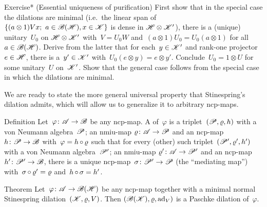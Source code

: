 \documentclass[b]{subfiles}
\begin{document}
\begin{parsec}
\begin{point}{Exercise* (Essential uniqueness of purification)}
    First show that in the special case the dilations are minimal
    (i.e.~the linear span of~$\{(a \otimes 1) V x;\  a \in \mathscr{B}(\mathscr{H}), x \in \mathscr{K}\}$ is dense
            in $\mathscr{H} \otimes \mathscr{K}'$),
        there is a (unique) unitary~$U_0$ on $\mathscr{H} \otimes \mathscr{K}'$
        with~$V = U_0 W$ and~$(a \otimes 1) U_0 = U_0 (a \otimes 1)$
            for all~$a \in \mathscr{B}(\mathscr{H})$.
    Derive from the latter
    that for each~$y \in \mathscr{K}'$ and rank-one projector~$e \in \mathscr{H}$,
        there is a~$y' \in \mathscr{K}'$
        with~$U_0 (e \otimes y) = e \otimes y'$.
    Conclude~$U_0 = 1 \otimes U$ for some unitary~$U$ on~$\mathscr{K}'$.
    Show  that the general case follows from the special case
        in which the dilations are minimal.
\end{point}
\end{parsec}
\begin{parsec}%
\begin{point}%
    We are ready to state the more general universal property
        that Stinespring's dilation admits,
        which will allow us to generalize it to arbitrary ncp-maps.
\end{point}
\begin{point}{Definition}%
    Let~$\varphi\colon \mathscr{A} \to \mathscr{B}$
        be any ncp-map.
    A  of~$\varphi$
    is a triplet~$(\mathscr{P}, \varrho, h)$
    with a von Neumann algebra~$\mathscr{P}$;
    an nmiu-map $\varrho \colon \mathscr{A} \to \mathscr{P}$
    and an ncp-map~$h \colon \mathscr{P} \to \mathscr{B}$
    with~$\varphi = h \mathop{\circ} \varrho$
    such that for every (other)
    such triplet~$(\mathscr{P}', \varrho', h')$
    with a von Neumann algebra~$\mathscr{P}'$;
    an nmiu-map $\varrho'\colon \mathscr{A} \to \mathscr{P}'$
    and an ncp-map~$h' \colon \mathscr{P}' \to \mathscr{B}$,
    there is a unique ncp-map~$\sigma \colon \mathscr{P}' \to \mathscr{P}$
    (the ``mediating map'')
    with~$\sigma \mathop{\circ} \varrho' = \varrho$
    and~$h \mathop{\circ} \sigma = h'$.
    \par %
\end{point}
\begin{point}{Theorem}%
Let~$\varphi\colon \mathscr{A} \to \mathscr{B}(\mathscr{H})$
    be any ncp-map
    together with a minimal normal Stinespring dilation~$(\mathscr{K},\varrho,V)$.
    Then $(\mathscr{B}(\mathscr{K}), \varrho, \mathrm{ad}_V)$
        is a Paschke dilation of~$\varphi$.


\end{point}
\end{parsec}
\end{document}
